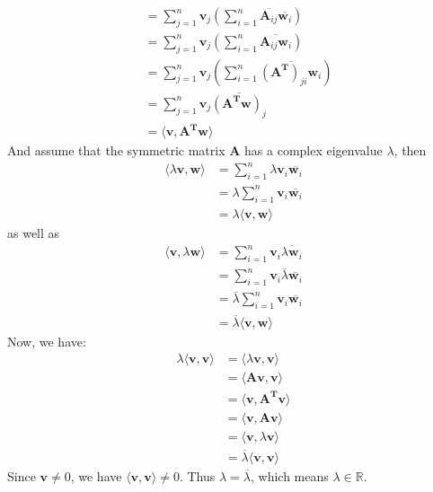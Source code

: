 \documentclass[oneside]{book}
\begin{document}
{{{\begin{align}
                &=\sum_{j=1}^{n}\mathbf{v}_{j}\left(\sum_{i=1}^{n}\overline{\mathbf{A}_{ij}}\overline{\mathbf{w}_{i}}\right)\\
                &=\sum_{j=1}^{n}\mathbf{v}_{j}\left(\sum_{i=1}^{n}\overline{\mathbf{A}_{ij}\mathbf{w}_{i}}\right)\\
                &=\sum_{j=1}^{n}\mathbf{v}_{j}\left(\sum_{i=1}^{n}\overline{(\mathbf{A}^{\mathbf{T}})_{ji}\mathbf{w}_{i}}\right)\\
                &=\sum_{j=1}^{n}\mathbf{v}_{j}\overline{\left(\mathbf{A}^{\mathbf{T}}\mathbf{w}\right)_{j}}\\
                &=\langle\mathbf{v},\mathbf{A}^{\mathbf{T}}\mathbf{w}\rangle
        \end{align}
        And assume that the symmetric matrix $\mathbf{A}$ has a complex eigenvalue $\lambda$, then
        \begin{align}
            \langle\lambda\mathbf{v},\mathbf{w}\rangle
                &=\sum_{i=1}^{n}\lambda\mathbf{v}_{i}\overline{\mathbf{w}_{i}}\\
                &=\lambda\sum_{i=1}^{n}\mathbf{v}_{i}\overline{\mathbf{w}_{i}}\\
                &=\lambda\langle\mathbf{v},\mathbf{w}\rangle
        \end{align}
        as well as
        \begin{align}
            \langle\mathbf{v},\lambda\mathbf{w}\rangle
                &=\sum_{i=1}^{n}\mathbf{v}_{i}\overline{\lambda\mathbf{w}_{i}}\\
                &=\sum_{i=1}^{n}\mathbf{v}_{i}\overline{\lambda}\overline{\mathbf{w}_{i}}\\
                &=\overline{\lambda}\sum_{i=1}^{n}\mathbf{v}_{i}\overline{\mathbf{w}_{i}}\\
                &=\overline{\lambda}\langle\mathbf{v},\mathbf{w}\rangle
        \end{align}
        Now, we have:
        \begin{align}
            \lambda\langle\mathbf{v},\mathbf{v}\rangle
                &=\langle\lambda\mathbf{v},\mathbf{v}\rangle\\
                &=\langle\mathbf{A}\mathbf{v},\mathbf{v}\rangle\\
                &=\langle\mathbf{v},\mathbf{A}^{\mathbf{T}}\mathbf{v}\rangle\\
                &=\langle\mathbf{v},\mathbf{A}\mathbf{v}\rangle\\
                &=\langle\mathbf{v},\lambda\mathbf{v}\rangle\\
                &=\overline{\lambda}\langle\mathbf{v},\mathbf{v}\rangle
        \end{align}
        Since $\mathbf{v}\neq0$, we have $\langle\mathbf{v},\mathbf{v}\rangle\neq0$. Thus $\lambda=\overline{\lambda}$, which means $\lambda \in \mathbb{R}$.
    }

}}
\end{document}
